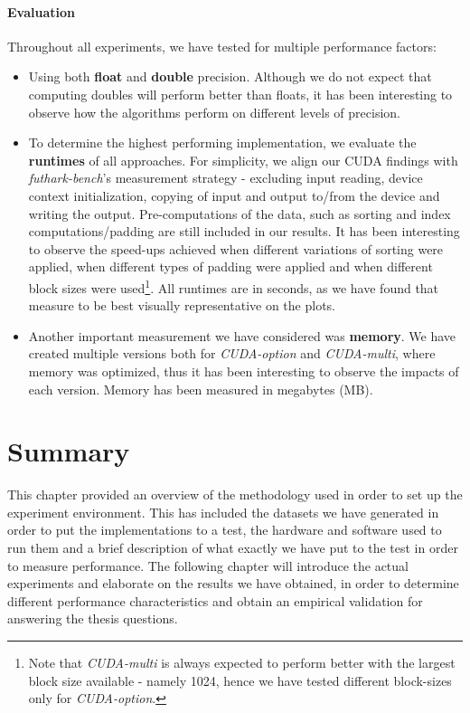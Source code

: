 \paragraph{Evaluation}
Throughout all experiments, we have tested for multiple performance factors:
\begin{itemize}
    \item Using both \textbf{float} and \textbf{double} precision. Although we do not expect that computing doubles will perform better than floats, it has been interesting to observe how the algorithms perform on different levels of precision.
    
    \item To determine the highest performing implementation, we evaluate the \textbf{runtimes} of all approaches. For simplicity, we align our CUDA findings with \textit{futhark-bench}'s measurement strategy - excluding input reading, device context initialization, copying of input and output to/from the device and writing the output. Pre-computations of the data, such as sorting and index computations/padding are still included in our results. It has been interesting to observe the speed-ups achieved when different variations of sorting were applied, when different types of padding were applied and when different block sizes were used\footnote{Note that \textit{CUDA-multi} is always expected to perform better with the largest block size available - namely 1024, hence we have tested different block-sizes only for \textit{CUDA-option}.}. All runtimes are in seconds, as we have found that measure to be best visually representative on the plots.
    
    \item Another important measurement we have considered was \textbf{memory}. We have created multiple versions both for \textit{CUDA-option} and \textit{CUDA-multi}, where memory was optimized, thus it has been interesting to observe the impacts of each version. Memory has been measured in megabytes (MB).
\end{itemize} 

\section*{Summary}
This chapter provided an overview of the methodology used in order to set up the experiment environment. This has included the datasets we have generated in order to put the implementations to a test, the hardware and software used to run them and a brief description of what exactly we have put to the test in order to measure performance. The following chapter will introduce the actual experiments and elaborate on the results we have obtained, in order to determine different performance characteristics and obtain an empirical validation for answering the thesis questions.